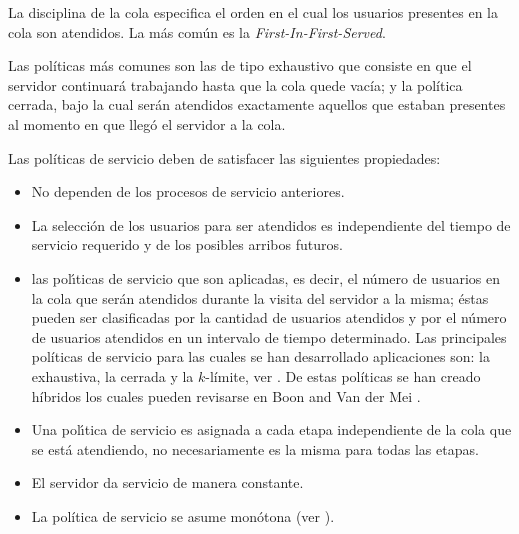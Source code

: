 \documentclass{article}
\begin{document}
La disciplina de la cola especifica el orden en el cual los usuarios presentes en la cola son atendidos. La m\'as com\'un es la {\em First-In-First-Served}.


Las pol\'iticas m\'as comunes son las de tipo exhaustivo que consiste en que el servidor continuar\'a trabajando hasta que la cola quede vac\'ia; y la pol\'itica cerrada, bajo la cual ser\'an atendidos exactamente aquellos que estaban presentes al momento en que lleg\'o el servidor a la cola. 

Las pol\'iticas de servicio deben de satisfacer las siguientes propiedades:
\begin{itemize}
\item[i)] No dependen de los procesos de servicio anteriores.
\item[ii)] La selecci\'on de los usuarios para ser atendidos es independiente del tiempo de servicio requerido  y de los posibles arribos futuros.
\item[iii)] las pol{\'\i}ticas de servicio que son aplicadas, es decir, el n\'umero de usuarios en la cola que ser{\'a}n atendidos durante la visita del servidor a la misma; \'estas pueden ser clasificadas por la cantidad de usuarios atendidos y por el n\'umero de usuarios atendidos en un intervalo de tiempo determinado. Las principales pol\'iticas de servicio para las cuales se han desarrollado aplicaciones son: la exhaustiva, la cerrada y la $k$-l\'imite, ver \cite{LevySidi, Takagi, Semenova}. De estas pol\'iticas se han creado h\'ibridos los cuales pueden revisarse en Boon and Van der Mei \cite{BoonMeiWinands}.

\item[iv)] Una pol{\'\i}tica de servicio es asignada a cada etapa independiente de la cola que se est{\'a} atendiendo, no necesariamente es la misma para todas las etapas.
\item[v)] El servidor da servicio de manera constante.

\item[vi)] La pol\'itica de servicio se asume mon\'otona (ver
\cite{Stability}).

\end{itemize}
\end{document}

